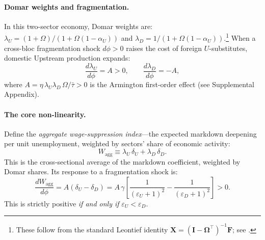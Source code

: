 \paragraph{Domar weights and fragmentation.}
In this two-sector economy, Domar weights are:
$\lambda_U = (1+\Omega)/(1+\Omega(1-\alpha_U))$ and
$\lambda_D = 1/(1+\Omega(1-\alpha_U))$.\footnote{These follow from
the standard Leontief identity $\mathbf{X} = (\mathbf{I} -
\boldsymbol{\Omega}^\top)^{-1}\mathbf{F}$; see \citet{baqaee2019}.}
When a cross-bloc fragmentation shock $d\phi > 0$ raises the cost of
foreign $U$-substitutes, domestic Upstream production expands:
\begin{equation}
  \frac{d\lambda_U}{d\phi} = A > 0, \qquad
  \frac{d\lambda_D}{d\phi} = -A,
  \label{eq:domar_shift}
\end{equation}
where $A = \eta\,\lambda_U\lambda_D\,\Omega/\bar\tau > 0$ is the
Armington first-order effect (see Supplemental Appendix).

\paragraph{The core non-linearity.}
Define the \emph{aggregate wage-suppression index}---the expected markdown
deepening per unit unemployment, weighted by sectors' share of economic
activity:
\begin{equation}
  W_{\text{agg}} \equiv \lambda_U\,\delta_U + \lambda_D\,\delta_D.
  \label{eq:W_agg}
\end{equation}
This is the cross-sectional average of the markdown coefficient, weighted
by Domar shares. Its response to a fragmentation shock is:
\begin{equation}
  \boxed{\frac{dW_{\text{agg}}}{d\phi} = A\!\left(\delta_U - \delta_D\right)
  = A\,\gamma\!\left[\frac{1}{(\varepsilon_U+1)^2} -
  \frac{1}{(\varepsilon_D+1)^2}\right] > 0.}
  \label{eq:core_nonlinearity}
\end{equation}
This is strictly positive \emph{if and only if} $\varepsilon_U < \varepsilon_D$.


